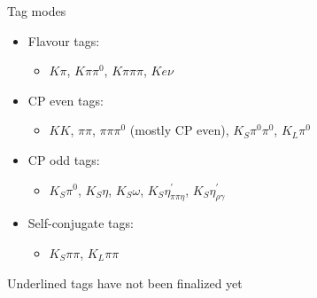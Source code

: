\documentclass{beamer}
\begin{document}
\begin{frame}{Tag modes}
  \begin{itemize}
    \setlength\itemsep{1.0em}
    \item{Flavour tags:}
    \begin{itemize}
      \item{$K\pi$, $K\pi\pi^0$, $K\pi\pi\pi$, \underline{$Ke\nu$}}
    \end{itemize}
    \item{CP even tags:}
    \begin{itemize}
      \item{$KK$, $\pi\pi$, $\pi\pi\pi^0$ (mostly CP even), $K_S\pi^0\pi^0$, $K_L\pi^0$}
    \end{itemize}
    \item{CP odd tags:}
    \begin{itemize}
      \item{$K_S\pi^0$, $K_S\eta$, $K_S\omega$, $K_S\eta^\prime_{\pi\pi\eta}$, $K_S\eta^\prime_{\rho\gamma}$}
    \end{itemize}
    \item{Self-conjugate tags:}
    \begin{itemize}
      \item{$K_S\pi\pi$, $K_L\pi\pi$}
    \end{itemize}
  \end{itemize}
  Underlined tags have not been finalized yet
\end{frame}
\end{document}
